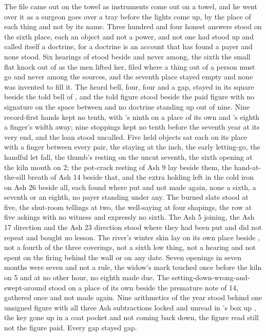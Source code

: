 The file came out on the towel as instruments come out on a towel, and he went over it as a surgeon goes over a tray before the lights come up, by the place of each thing and not by its name. Three hundred and four honest answers stood on the sixth place, each an object and not a power, and not one had stood up and called itself a doctrine, for a doctrine is an account that has found a payer and none stood. Six hearings of  stood beside and never among, the sixth the small flat knock out of  as the men lifted her, filed where a thing out of a person must go and never among the sources, and the seventh place stayed empty and none was invented to fill it. The heard bell, four, four and a gap, stayed in its square beside the told bell of , and the told figure stood beside the paid figure with no signature on the space between and no doctrine standing up out of nine. Nine record-first hands kept no tenth, with 's ninth on a place of its own and 's eighth a finger's width away; nine stoppings kept no tenth before the seventh year at its very end, and the loan stood uncalled. Five held objects sat each on its place with a finger between every pair, the staying at the inch, the early letting-go, the handful let fall, the thumb's resting on the uncut seventh, the sixth opening at the kiln mouth on  2; the pot-crack resting of Ash 9 lay beside them, the hand-at-the-sill breath of Ash 14 beside that, and the extra holding  left in the cold iron on Ash 26 beside all, each found where put and not made again, none a sixth, a seventh or an eighth, no payer standing under any. The burned slate stood at five, the shut-room tellings at two, the well-saying at four shapings, the row at five askings with no witness and expressly no sixth. The Ash 5 joining, the Ash 17 direction and the Ash 23 direction stood where they had been put and did not repeat and bought no lesson. The river's winter skin lay on its own place beside , not a fourth of the three coverings, not a sixth low thing, not a hearing and not spent on the firing behind the wall or on any date. Seven openings in seven months were seven and not a rule, the widow's mark touched once before the kiln on  5 and at no other hour, no eighth made due. The setting-down-wrong-and-swept-around stood on a place of its own beside the premature note of  14, gathered once and not made again. Nine arithmetics of the year stood behind one unsigned figure with all three Ash subtractions locked and unread in 's box up , the key gone up in a coat pocket and not coming back down, the figure read still not the figure paid. Every gap stayed gap.

